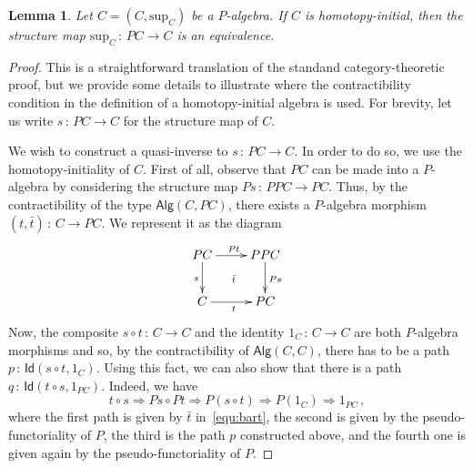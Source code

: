 \documentclass[10pt,a4paper,oneside,reqno]{amsart}
\newcommand{\xycenter}[1]{\vcenter{\hbox{\xymatrix{#1}}}}
\theoremstyle{mythm}
\newtheorem{lemma}[theorem]{Lemma}
\theoremstyle{mydef}
\theoremstyle{myrmk}
\newcommand{\co}{\,{:}\,}
\newcommand{\Id}{\mathsf{Id}}
\newcommand{\Palg}{\mathsf{Alg}}
\renewcommand{\sup}{\mathrm{sup}}
\begin{document}
\begin{lemma}\label{lem:IntLambek} Let $C = (C, \sup_C)$ be a $P$-algebra. 
If $C$ is homotopy-initial, then the structure map $\sup_C \co PC \to C$ is an equivalence.
\end{lemma}


\begin{proof} This is a straightforward translation of the standand category-theoretic proof, but we provide
some details to illustrate where the contractibility condition in the definition of a homotopy-initial algebra is
used. For brevity, let us write $s \co PC \to C$ for the structure map of $C$. 

 We wish to construct a quasi-inverse to $s \co PC \to C$. In order to do so, we use the homotopy-initiality
of $C$. First of all, observe that $PC$ can be made into a $P$-algebra by considering the structure map 
$Ps \co PPC \to PC$. Thus, by the contractibility of the type $\Palg(C, PC)$, there exists a $P$-algebra
morphism $(t, \bar{t}) \co C \to PC$. We represent it as the diagram
\begin{equation}
\label{equ:bart}
\xycenter{
PC \ar[d]_{s} \ar[r]^{Pt} \ar@{}[dr]|{\bar{t}}& PPC \ar[d]^{Ps} \\
C \ar[r]_{t} & PC}
\end{equation}
Now, the composite $s \circ t \co C \to C$ and the identity $1_C \co C \to C$ are both $P$-algebra
morphisms and so, by the contractibility of $\Palg(C,C)$, there has to be a path $p \co \Id(s\circ t ,1_C)$. 
Using this fact, we can also show that there is a path $q \co \Id(t \circ s, 1_{PC})$. Indeed, we have
\[
t \circ s  \Rightarrow Ps \circ Pt 
 \Rightarrow P(s \circ t) 
 \Rightarrow P(1_C) 
  \Rightarrow 1_{PC} \, ,
\]
where the first path is given by $\bar{t}$ in~\eqref{equ:bart}, the second is given by the pseudo-functoriality of $P$,
the third is the path $p$ constructed above, and the fourth one is given again by the pseudo-functoriality of $P$. 
\end{proof}
\end{document}

